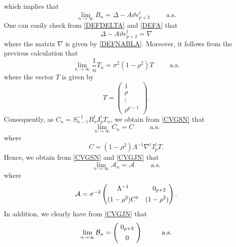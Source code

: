 \documentclass[article,12pt]{amsart}
\numberwithin{equation}{section}
\theoremstyle{plain}
\begin{document}
which implies that
\begin{equation*}
\lim_{n\rightarrow \infty} B_{n} 
 = \Delta - A \vartheta e_{p+2}^{t}
\hspace{1cm} \text{a.s.}
\end{equation*}
 One can easily check from \eqref{DEFDELTA} and \eqref{DEFA} that
 $$
 \Delta - A \vartheta e_{p+2}^{t}= \nabla
 $$
 where the matrix $\nabla$ is given by \eqref{DEFNABLA}.
Moreover, it follows from the previous calculation that
\begin{equation*}
\lim_{n\rightarrow \infty} \frac{1}{n}T_{n} 
 =  \sigma^2 (1- \rho^2) T \hspace{1cm} \text{a.s.}
\end{equation*}
where the vector $T$ is given by
\begin{equation}
\label{DEFVT}
T
 =
\begin{pmatrix}
1  \\ 
\rho  \\ 
\vdots  \\  
 \rho^{p-1} 
\end{pmatrix}.
\end{equation}
Consequently, as 
$C_n=S_{n-1}^{-1} B_n^{t} {\mathrm{J}}_p^{t} T_n$, we obtain from \eqref{CVGSN} that
\begin{equation*}
\lim_{n\rightarrow \infty} C_{n} 
 =  C
\hspace{1cm} \text{a.s.}
\end{equation*}
where
$$
C = (1- \rho^2) \Lambda^{-1} \nabla^{t} {\mathrm{J}}_p ^{t} T.
$$
Hence, we obtain from \eqref{CVGSN} and \eqref{CVGJN} that
\begin{equation}
\label{CVGFINCA}
\lim_{n\rightarrow \infty} {\mathcal{A}}_{n} 
 =  {\mathcal{A}}
\hspace{1cm} \text{a.s.}
\end{equation}
where
$$
{\mathcal{A}}= \sigma^{-2}
 \begin{pmatrix}
\Lambda^{-1} & \ \ 0_{p+2}  \vspace{1ex}\\
(1- \rho^2) C^{t} & (1- \rho^2)
\end{pmatrix}.
$$
In addition, we clearly have from \eqref{CVGJN}  that
\begin{equation}
\label{CVGFINCB}
\lim_{n\rightarrow \infty} {\mathcal{B}}_n= \begin{pmatrix}
\ 0_{p+2} \ \vspace{1ex}\\
 0
\end{pmatrix}\hspace{1cm} \text{a.s.}
\end{equation}
\end{document}

